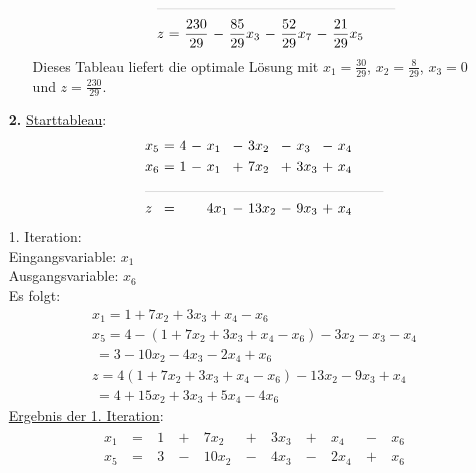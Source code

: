 \documentclass [a4paper,11pt]{article}
\begin{document}
\begin{enumerate}
\begin{enumerate}
\begin{align*}
\begin{alignedat}{6}
                &\rlap{\rule{6cm}{.1pt}} &&&&&&&&\\
                & z   &\ = &\ \frac{230}{29} &\ - &\ \frac{85}{29}x_3 &\ - &\ \frac{52}{29}x_7 &\ - &\ \frac{21}{29}x_5
                \end{alignedat}
                \end{align*}
                Dieses Tableau liefert die optimale Lösung mit $x_1 = \frac{30}{29}$, $x_2 = \frac{8}{29}$, $x_3 = 0$ und $z = \frac{230}{29}$.
            \end{enumerate}
        \item[\textbf{2.}]
            \underline{Starttableau}:
            \begin{align*}
            \begin{alignedat}{6}
            & x_5 &\ = &\ 4 &\ - &\  x_1 &\ - &\  3x_2 &\ - &\  x_3 &\ - &\ x_4 \\
            & x_6 &\ = &\ 1 &\ - &\  x_1 &\ + &\  7x_2 &\ + &\ 3x_3 &\ + &\ x_4 \\
            &\rlap{\rule{6cm}{.1pt}} &&&&&&&&&&\\
            & z   &\ = &    &    &\ 4x_1 &\ - &\ 13x_2 &\ - &\ 9x_3 &\ + &\ x_4
            \end{alignedat}
            \end{align*}
            1. Iteration:\\
            Eingangsvariable: $x_1$\\
            Ausgangsvariable: $x_6$\\
            Es folgt:
            \begin{align*}
            & x_1 = 1 + 7x_2 + 3x_3 + x_4 - x_6\\
            & x_5 = 4 - \left( 1 + 7x_2 + 3x_3 + x_4 - x_6 \right) - 3x_2 - x_3 - x_4\\
            &   \ = 3 - 10x_2 - 4x_3 - 2x_4 + x_6\\
            &   z = 4 \left( 1 + 7x_2 + 3x_3 + x_4 - x_6 \right) - 13x_2 - 9x_3 + x_4\\
            &   \ = 4 + 15x_2 + 3x_3 + 5x_4 - 4x_6
            \end{align*}
            \underline{Ergebnis der 1. Iteration}:
            \begin{align*}
            \begin{alignedat}{6}
            & x_1 &\ = &\ 1 &\ + &\  7x_2 &\ + &\ 3x_3 &\ + &\  x_4 &\ - &\ x_6 \\
            & x_5 &\ = &\ 3 &\ - &\ 10x_2 &\ - &\ 4x_3 &\ - &\ 2x_4 &\ + &\ x_6 \\

\end{alignedat}
\end{align*}
\end{enumerate}
\end{document}
